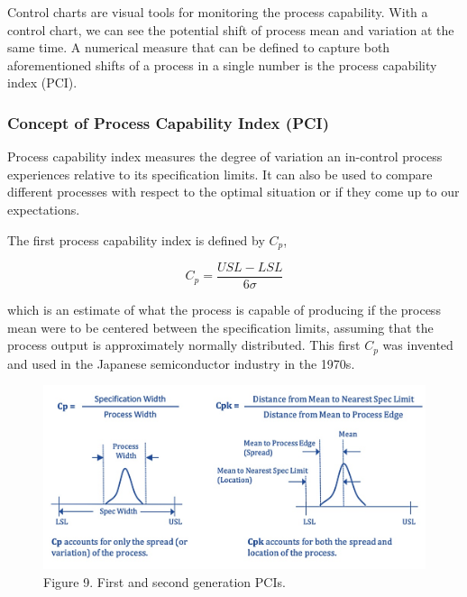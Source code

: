 \documentclass[
]{article}
\begin{document}
Control charts are visual tools for monitoring the process capability.
With a control chart, we can see the potential shift of process mean and
variation at the same time. A numerical measure that can be defined to
capture both aforementioned shifts of a process in a single number is
the process capability index (PCI).

\hypertarget{concept-of-process-capability-index-pci}{%
\subsubsection{Concept of Process Capability Index
(PCI)}\label{concept-of-process-capability-index-pci}}

Process capability index measures the degree of variation an in-control
process experiences relative to its specification limits. It can also be
used to compare different processes with respect to the optimal
situation or if they come up to our expectations.

The first process capability index is defined by \(C_p\),

\[
C_p = \frac{USL-LSL}{6\sigma}
\]

which is an estimate of what the process is capable of producing if the
process mean were to be centered between the specification limits,
assuming that the process output is approximately normally distributed.
This first \(C_p\) was invented and used in the Japanese semiconductor
industry in the 1970s.

\begin{figure}

{\centering \includegraphics[width=13.99in]{img/w10-1st-2nd-generation-PCIs} 

}

\caption{Figure 9. First and second generation PCIs.}\label{fig:unnamed-chunk-11}
\end{figure}
\end{document}
